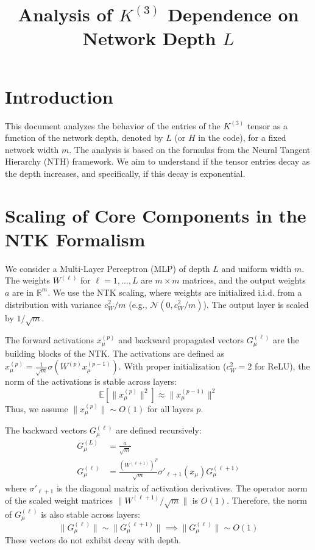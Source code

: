 \documentclass[11pt,a4paper]{article}
\title{\textbf{Analysis of $K^{(3)}$ Dependence on Network Depth $L$}}
\author{}
\date{}
\begin{document}
\maketitle

\section{Introduction}

This document analyzes the behavior of the entries of the $K^{(3)}$ tensor as a function of the network depth, denoted by $L$ (or $H$ in the code), for a fixed network width $m$. The analysis is based on the formulas from the Neural Tangent Hierarchy (NTH) framework. We aim to understand if the tensor entries decay as the depth increases, and specifically, if this decay is exponential.

\section{Scaling of Core Components in the NTK Formalism}

We consider a Multi-Layer Perceptron (MLP) of depth $L$ and uniform width $m$. The weights $W^{(\ell)}$ for $\ell=1, \dots, L$ are $m \times m$ matrices, and the output weights $a$ are in $\mathbb{R}^m$. We use the NTK scaling, where weights are initialized i.i.d. from a distribution with variance $c_W^2/m$ (e.g., $\mathcal{N}(0, c_W^2/m)$). The output layer is scaled by $1/\sqrt{m}$.

The forward activations $x^{(p)}_\mu$ and backward propagated vectors $G^{(\ell)}_\mu$ are the building blocks of the NTK.
The activations are defined as $x^{(p)}_\mu = \frac{1}{\sqrt{m}}\sigma(W^{(p)} x^{(p-1)}_\mu)$. With proper initialization ($c_W^2=2$ for ReLU), the norm of the activations is stable across layers:
\begin{equation}
    \mathbb{E}[\|x^{(p)}_\mu\|^2] \approx \|x^{(p-1)}_\mu\|^2
\end{equation}
Thus, we assume $\|x^{(p)}_\mu\| \sim O(1)$ for all layers $p$.

The backward vectors $G^{(\ell)}_\mu$ are defined recursively:
\begin{align}
    G^{(L)}_\mu &= \frac{a}{\sqrt{m}} \\
    G^{(\ell)}_\mu &= \frac{(W^{(\ell+1)})^T}{\sqrt{m}} \sigma'_{\ell+1}(x_\mu) G^{(\ell+1)}_\mu
\end{align}
where $\sigma'_{\ell+1}$ is the diagonal matrix of activation derivatives. The operator norm of the scaled weight matrices $\|W^{(\ell+1)}/\sqrt{m}\|$ is $O(1)$. Therefore, the norm of $G^{(\ell)}_\mu$ is also stable across layers:
\begin{equation}
    \|G^{(\ell)}_\mu\| \sim \|G^{(\ell+1)}_\mu\| \implies \|G^{(\ell)}_\mu\| \sim O(1)
\end{equation}
These vectors do not exhibit decay with depth.
\end{document}

